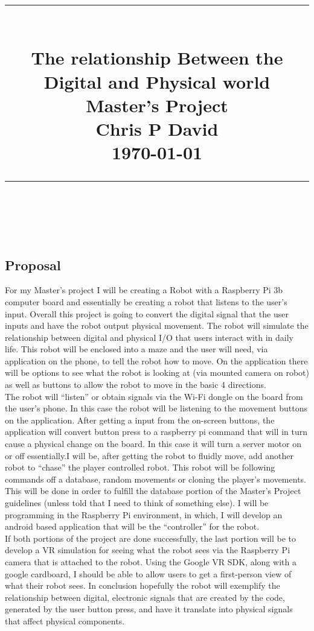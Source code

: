 \documentclass[13ptletterpaper]{paper}
\title{
	\begin{center}
		\normalfont \normalsize
		\rule{\linewidth}{.5pt} \\[0.4cm] 
		\huge {The relationship Between the Digital and Physical world} \\ 
		\large {Master's Project}\\
		\small{Chris P David}\\
		{\today}\\
		\rule{\linewidth}{.5pt} \\
	\end{center}
}
\newcommand\tab[1][1cm]{\hspace*{#1}}
\begin{document}
	\begin{titlepage}
		\clearpage
		\maketitle
		\thispagestyle{empty}
	\end{titlepage}
	\pagebreak	\tableofcontents
	
	\begin{flushleft}
	\pagebreak
	\section{Proposal}
	\tab For my Master’s project I will be creating a Robot with a Raspberry Pi 3b computer	board and essentially be creating a robot that listens to the user’s input. Overall this project is going to convert the digital signal that the user inputs and have the robot output physical movement. The robot will simulate the relationship between digital and physical I/O that users interact with in daily life. This robot will be enclosed into a maze and the user will need, via application on the phone, to tell the robot how to move. On the application there will be options to see what the	robot is looking at (via mounted camera on robot) as well as buttons to allow the robot to move	in the basic 4 directions.	\\
	\tab The robot will “listen” or obtain signals via the Wi-Fi dongle on the board from the user’s phone. In this case the robot will be listening to the movement buttons on the application. After getting a input from the on-screen buttons, the application will convert button press to a raspberry pi command that will in turn cause a physical change on the board. In this case it will turn a server motor on or off essentially.I will be, after getting the robot to fluidly move, add another robot to “chase” the player controlled robot. This robot will be following commands off a database, random movements or	cloning the player’s movements. This will be done in order to fulfill the database portion of the Master’s Project guidelines (unless told that I need to think of something else). I will be programming in the Raspberry Pi environment, in which, I will develop an android based application that will be the “controller” for the robot. \\
	\tab If both portions of the project are done successfully, the last portion will be to develop a	VR simulation for seeing what the robot sees via the Raspberry Pi camera that is attached to the robot. Using the Google VR SDK, along with a google cardboard, I should be able to allow users	to get a first-person view of what their robot sees. In conclusion hopefully the robot will exemplify the relationship between digital, electronic signals that are created by the code, generated by the user button press, and have it translate into physical signals that affect physical components.

\end{flushleft}
\end{document}
